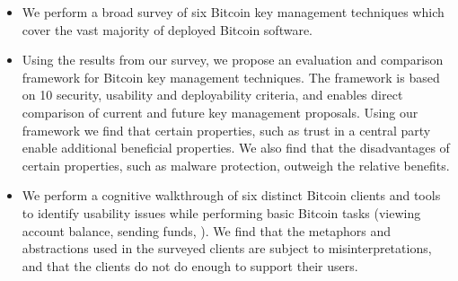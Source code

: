 \begin{itemize}
\item We perform a broad survey of six Bitcoin key management techniques which cover the vast majority of deployed Bitcoin software. 

\item Using the results from our survey, we propose an evaluation and comparison framework for Bitcoin key management techniques. The framework is based on 10 security, usability and deployability criteria, and enables direct comparison of current and future key management proposals. Using our framework we find that certain properties, such as trust in a central party enable additional beneficial properties. We also find that the disadvantages of certain properties, such as malware protection, outweigh the relative benefits.

\item We perform a cognitive walkthrough of six distinct Bitcoin clients and tools to identify usability issues while performing basic Bitcoin tasks (\eg viewing account balance, sending funds, \etc). We find that the metaphors and abstractions used in the surveyed clients are subject to misinterpretations, and that the clients do not do enough to support their users.

\end{itemize}



